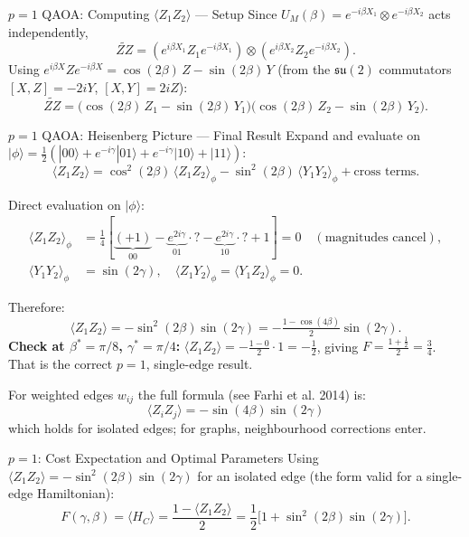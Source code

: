 \documentclass{beamer}
\begin{document}
\begin{frame}
\begin{frame}{$p=1$ QAOA: Computing $\langle Z_1Z_2\rangle$ — Setup}
Since $U_M(\beta)=e^{-i\beta X_1}\otimes e^{-i\beta X_2}$ acts independently,
\[
\widetilde{ZZ}
= (e^{i\beta X_1}Z_1 e^{-i\beta X_1})\otimes(e^{i\beta X_2}Z_2 e^{-i\beta X_2}).
\]
Using $e^{i\beta X}Ze^{-i\beta X} = \cos(2\beta)\,Z - \sin(2\beta)\,Y$
(from the $\mathfrak{su}(2)$ commutators $[X,Z]=-2iY$, $[X,Y]=2iZ$):
\[
\widetilde{ZZ}
= \bigl(\cos(2\beta)\,Z_1 - \sin(2\beta)\,Y_1\bigr)
  \bigl(\cos(2\beta)\,Z_2 - \sin(2\beta)\,Y_2\bigr).
\]
\end{frame}


\begin{frame}{$p=1$ QAOA: Heisenberg Picture — Final Result}
Expand and evaluate on $|\phi\rangle = \tfrac{1}{2}(|00\rangle
+ e^{-i\gamma}|01\rangle + e^{-i\gamma}|10\rangle + |11\rangle)$:
\[
\langle Z_1Z_2\rangle
= \cos^2(2\beta)\,\langle Z_1Z_2\rangle_\phi
- \sin^2(2\beta)\,\langle Y_1Y_2\rangle_\phi
+ \text{cross terms.}
\]

Direct evaluation on $|\phi\rangle$:
\begin{align*}
\langle Z_1Z_2\rangle_\phi &=
\tfrac{1}{4}[\underbrace{(+1)}_{00}-\underbrace{e^{2i\gamma}}_{01}\cdot?-\underbrace{e^{2i\gamma}}_{10}\cdot?+1]
= 0 \quad(\text{magnitudes cancel}),\\
\langle Y_1Y_2\rangle_\phi &= \sin(2\gamma),
\quad \langle Z_1Y_2\rangle_\phi = \langle Y_1Z_2\rangle_\phi = 0.
\end{align*}

Therefore:
\[
\langle Z_1Z_2\rangle = -\sin^2(2\beta)\sin(2\gamma)
= -\tfrac{1-\cos(4\beta)}{2}\sin(2\gamma).
\]
\textbf{Check at $\beta^*=\pi/8$, $\gamma^*=\pi/4$:}
$\langle Z_1Z_2\rangle = -\tfrac{1-0}{2}\cdot 1 = -\tfrac{1}{2}$, giving
$F = \tfrac{1+\frac{1}{2}}{2} = \tfrac{3}{4}$. That is the correct $p=1$, single-edge result.

\medskip
For weighted edges $w_{ij}$ the full formula (see Farhi et al. 2014) is:
\[
\boxed{\langle Z_iZ_j\rangle = -\sin(4\beta)\sin(2\gamma)}
\]
which holds for isolated edges; for graphs, neighbourhood corrections enter.
\end{frame}


\begin{frame}{$p=1$: Cost Expectation and Optimal Parameters}
Using $\langle Z_1Z_2\rangle = -\sin^2(2\beta)\sin(2\gamma)$
for an isolated edge (the form valid for a single-edge Hamiltonian):
\[
F(\gamma,\beta)
= \langle H_C\rangle
= \frac{1 - \langle Z_1Z_2\rangle}{2}
= \frac{1}{2}\bigl[1 + \sin^2(2\beta)\sin(2\gamma)\bigr].
\]


\end{frame}
\end{frame}
\end{document}
